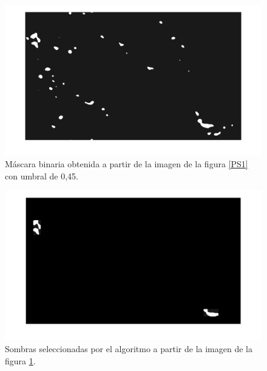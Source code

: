\begin{figure}[h!]
    \includegraphics[width=\textwidth]{Imagenes/Homomorfico/PS1_bin.png}
     \hfill
     \caption{Máscara binaria obtenida a partir de la imagen de la figura \ref{PS1} con umbral de 0,45.}
    \label{mascaraPS1}
\end{figure}

\begin{figure}[h!]
    \includegraphics[width=\textwidth]{Imagenes/Homomorfico/PS1_masked.png}
     \hfill
     \caption{Sombras seleccionadas por el algoritmo a partir de la imagen de la figura \ref{mascaraPS1}.}
    \label{seleccionadaST}
\end{figure}